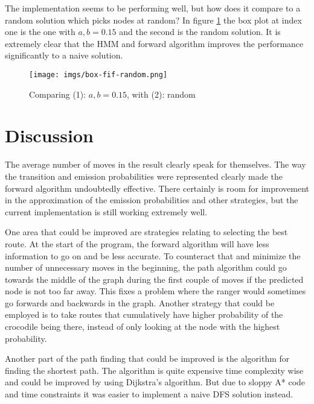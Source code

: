 \documentclass[12pt, a4paper]{article}
\begin{document}
The implementation seems to be performing well, but how does it compare to a random solution which picks nodes at random? In figure \ref{fig:box-fif-random.png} the box plot at index one is the one with $a,b=0.15$ and the second is the random solution. It is extremely clear that the HMM and forward algorithm improves the performance significantly to a naive solution.

\begin{figure}[!ht]\label{fig:box-fif-random.png}
\centering
\texttt{[image: imgs/box-fif-random.png]}\\
\caption{Comparing (1): $a,b=0.15$, with (2): random}
\end{figure}

\section{Discussion}

The average number of moves in the result clearly speak for themselves. The way the transition and emission probabilities were represented clearly made the forward algorithm undoubtedly effective. There certainly is room for improvement in the approximation of the emission probabilities and other strategies, but the current implementation is still working extremely well.

One area that could be improved are strategies relating to selecting the best route. At the start of the program, the forward algorithm will have less information to go on and be less accurate. To counteract that and minimize the number of unnecessary moves in the beginning, the path algorithm could go towards the middle of the graph during the first couple of moves if the predicted node is not too far away. This fixes a problem where the ranger would sometimes go forwards and backwards in the graph. Another strategy that could be employed is to take routes that cumulatively have higher probability of the crocodile being there, instead of only looking at the node with the highest probability.

Another part of the path finding that could be improved is the algorithm for finding the shortest path. The algorithm is quite expensive time complexity wise and could be improved by using Dijkstra's algorithm. But due to sloppy A* code and time constraints it was easier to implement a naive DFS solution instead.

\end{document}
